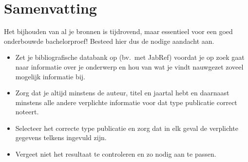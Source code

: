 


\section{Samenvatting}%
\label{sec:bibliografie-samenvatting}

Het bijhouden van al je bronnen is tijdrovend, maar essentieel voor een goed onderbouwde bachelorproef! Besteed hier dus de nodige aandacht aan.

\begin{itemize}
  \item Zet je bibliografische databank op (bv.\ met JabRef) voordat je op zoek gaat naar informatie over je onderwerp en hou van wat je vindt nauwgezet zoveel mogelijk informatie bij.
  \item Zorg dat je altijd minstens de auteur, titel en jaartal hebt en daarnaast minstens alle andere verplichte informatie voor dat type publicatie correct noteert.
  \item Selecteer het correcte type publicatie en zorg dat in elk geval de verplichte gegevens telkens ingevuld zijn.
  \item Vergeet niet het resultaat te controleren en zo nodig aan te passen.
\end{itemize}
